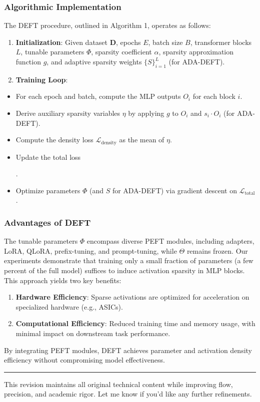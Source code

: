 \documentclass[10pt,twocolumn]{article}
\begin{document}
\subsubsection*{Algorithmic Implementation}
The DEFT procedure, outlined in Algorithm 1, operates as follows:
\begin{enumerate}
  \item \textbf{Initialization}: Given dataset \(\mathbf{D}\), epochs \(E\), batch size \(B\), transformer blocks \(L\), tunable parameters \(\Phi\), sparsity coefficient \(\alpha\), sparsity approximation function \(g\), and adaptive sparsity weights \(\{S\}_{i=1}^{L}\) (for ADA-DEFT).
  \item \textbf{Training Loop}:
\end{enumerate}
\begin{itemize}
  \item For each epoch and batch, compute the MLP outputs \(O_i\) for each block \(i\).
  \item Derive auxiliary sparsity variables \(\eta\) by applying \(g\) to \(O_i\) and \(s_i \cdot O_i\) (for ADA-DEFT).
  \item Compute the density loss \(\mathcal{L}_{\text{density}}\) as the mean of \(\eta\).
  \item Update the total loss \begin{center}
\end{center}.
  \item Optimize parameters \(\Phi\) (and \(S\) for ADA-DEFT) via gradient descent on \(\mathcal{L}_{\text{total}}\).
\end{itemize}
\subsubsection*{Advantages of DEFT}
The tunable parameters \(\Phi\) encompass diverse PEFT modules, including adapters, LoRA, QLoRA, prefix-tuning, and prompt-tuning, while \(\Theta\) remains frozen. Our experiments demonstrate that training only a small fraction of parameters (a few percent of the full model) suffices to induce activation sparsity in MLP blocks. This approach yields two key benefits:
\begin{enumerate}
  \item \textbf{Hardware Efficiency}: Sparse activations are optimized for acceleration on specialized hardware (e.g., ASICs).
  \item \textbf{Computational Efficiency}: Reduced training time and memory usage, with minimal impact on downstream task performance.
\end{enumerate}
By integrating PEFT modules, DEFT achieves parameter and activation density efficiency without compromising model effectiveness.
\vspace{1em} \hrule \vspace{1em}
This revision maintains all original technical content while improving flow, precision, and academic rigor. Let me know if you'd like any further refinements.
\end{document}
